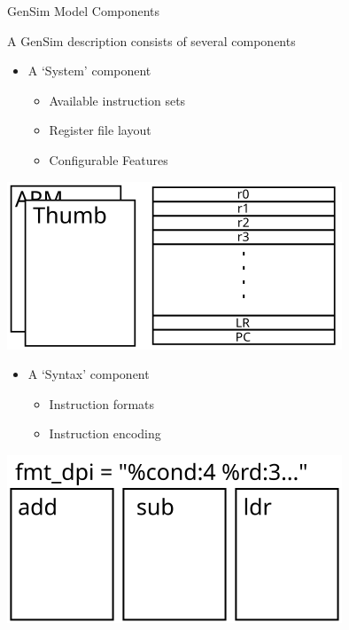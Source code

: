 \begin{frame}{GenSim Model Components}

A GenSim description consists of several components
\pause

\begin{minipage}[h]{0.6\textwidth}
\begin{itemize}
\item A `System' component
\begin{itemize}
\item Available instruction sets
\item Register file layout
\item Configurable Features
\end{itemize}
\end{itemize}
\end{minipage}%
\begin{minipage}[h]{0.35\textwidth}
\centering
\includegraphics[width=\textwidth]{figures/component-system}
\end{minipage}

\smallskip
\pause

\begin{minipage}[h]{0.6\textwidth}
\begin{itemize}
\item A `Syntax' component
\begin{itemize}
\item Instruction formats
\item Instruction encoding
\end{itemize}
\end{itemize}
\end{minipage}%
\begin{minipage}[h]{0.35\textwidth}
\centering
\includegraphics[width=\textwidth]{figures/component-syntax}
\end{minipage}


\end{frame}
